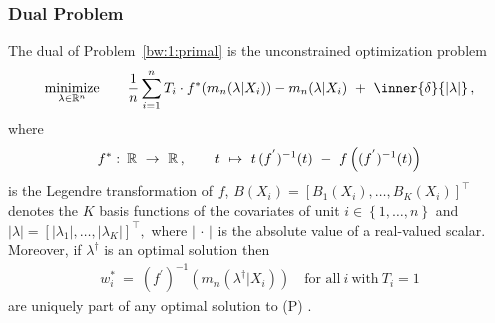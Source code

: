 \subsubsection*{Dual Problem}
\begin{ftheorem}
  The dual of Problem~\ref{bw:1:primal} is the unconstrained optimization problem 
  \begin{gather*}
    \underset{\lambda \in \R^n}{\mathrm{minimize}}
    \qquad
    \frac{1}{n}
    \sum_{i = 1}^{n} 
    T_i 
    \cdot
    f^*
    (
      m_n(\lambda|X_i)
    )
    -
      m_n(\lambda|X_i)
    \ 
    +
    \ 
    \inner{\delta}{\left| \lambda \right|}
    \,,
  \end{gather*}
  where
  \begin{gather*}
  f^*
  \,
  \colon
  \, 
  \R
  \ 
  \to
  \ 
  \R
  \,
  ,
  \qquad 
  t 
  \ 
  \mapsto
  \ 
    t\,(f^{'})^{-1}(t)
  \ 
    -
  \ 
    f
    \left( 
      (f^{'})^{-1}(t)
    \right)
  \end{gather*}
  is the Legendre transformation of $f$,
  $
    B(X_i)
    =
    \left[ 
      B_1(X_i)
      ,
      \ldots
      ,
      B_K(X_i)
    \right]
    ^\top
  $
  denotes the $K$ basis functions of the covariates 
  of unit $i\in \left\{ 1, \ldots, n \right\}$
  and
  $
    \left| \lambda \right|
    =
    \left[ 
      \left| \lambda_1 \right|
      ,
      \ldots
      ,
      \left| \lambda_K \right|
    \right]
    ^\top
    ,
  $
  where $\left| \,\cdot\, \right|$
  is the absolute value of a real-valued scalar.
  Moreover, if $\lambda^\dagger$
  is an optimal solution then
  \begin{gather*}
    w_i^*
    \ 
    =
    \ 
    (f^{'})^{-1}
    \left( 
      m_n
      (
      \lambda^\dagger
      |
      X_i
      )
    \right)
    \quad
    \text{for all}\ 
    i
    \ 
    \text{with}\ 
    T_i=1
  \end{gather*}
  are uniquely part of any optimal solution to (P)
  .
\end{ftheorem}
